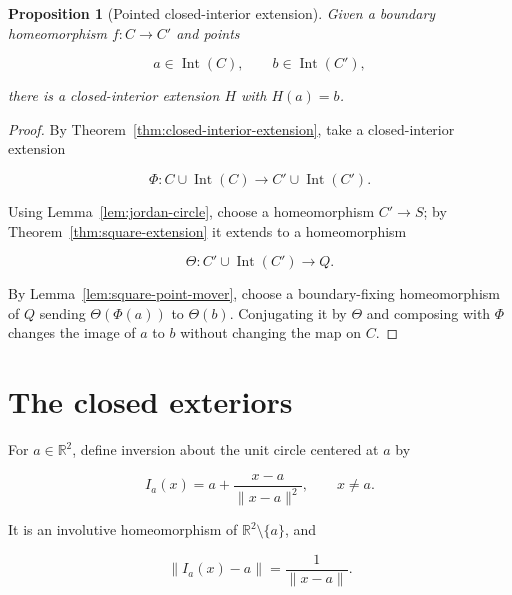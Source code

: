 \documentclass[11pt]{article}
\theoremstyle{mainplain}
\newtheorem{proposition}[theorem]{Proposition}
\theoremstyle{mainroman}
\theoremstyle{definition}
\numberwithin{equation}{section}
\begin{document}
\begin{proposition}[Pointed closed-interior extension]\label{prop:pointed-extension}
Given a boundary homeomorphism \(f:C\to C'\) and points

\[
a\in\operatorname{Int}(C),
\qquad
b\in\operatorname{Int}(C'),
\]

there is a closed-interior extension \(H\) with \(H(a)=b\).
\end{proposition}
\begin{proof}
By Theorem~\ref{thm:closed-interior-extension}, take a closed-interior extension

\[
\Phi:C\cup\operatorname{Int}(C)
 \longrightarrow
C'\cup\operatorname{Int}(C').
\]

Using Lemma~\ref{lem:jordan-circle}, choose a homeomorphism
\(C'\to S\); by Theorem~\ref{thm:square-extension} it extends to a
homeomorphism

\[
\Theta:C'\cup\operatorname{Int}(C')\longrightarrow Q.
\]

By Lemma~\ref{lem:square-point-mover}, choose a boundary-fixing homeomorphism of \(Q\) sending \(\Theta(\Phi(a))\) to \(\Theta(b)\). Conjugating it by \(\Theta\) and composing with \(\Phi\) changes the image of \(a\) to \(b\) without changing the map on \(C\). \end{proof}

\section{The closed exteriors}\label{the-closed-exteriors}

For \(a\in\mathbb R^2\), define inversion about the unit circle centered at \(a\) by

\[
I_a(x)
 =
a+\frac{x-a}{\|x-a\|^2},
\qquad x\ne a.
\]

It is an involutive homeomorphism of \(\mathbb R^2\setminus\{a\}\), and

\[
\|I_a(x)-a\|=\frac1{\|x-a\|}.
\]
\end{document}
